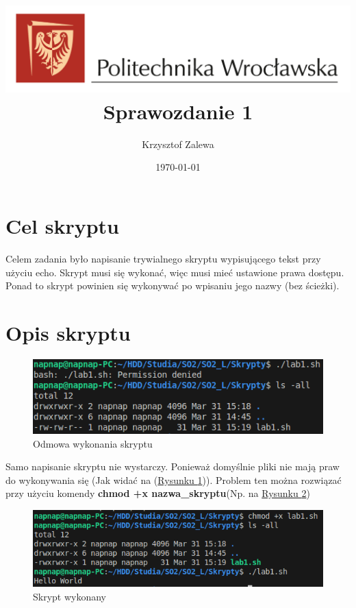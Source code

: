 \documentclass{article}
\title{
  \centering
  \includegraphics[width=\textwidth]{images/logo_PWr_kolor_poziom.png}\\
  \fontsize{28pt}{30pt}\selectfont Sprawozdanie 1\\
  }
\author{Krzysztof Zalewa}
\date{\daymonthyear\today}
\begin{document}
    \maketitle
    \pagebreak
    \tableofcontents
    \FloatBarrier
    \section{Cel skryptu}
      Celem zadania było napisanie trywialnego skryptu wypisującego tekst przy użyciu echo.
      Skrypt musi się wykonać, więc musi mieć ustawione prawa dostępu. Ponad to skrypt powinien 
      się wykonywać po wpisaniu jego nazwy (bez ścieżki).
    \section{Opis skryptu}
      \FloatBarrier
      \begin{figure}[ht]
        \centering
        \includegraphics[width=\textwidth]{images/permission_denied.png}
        \caption{Odmowa wykonania skryptu}
        \label{fig:perm_denied}
      \end{figure}
      \FloatBarrier
      Samo napisanie skryptu nie wystarczy. Ponieważ domyślnie pliki nie mają praw do wykonywania się (Jak widać na
      (\hyperref[fig:perm_denied]{Rysunku \ref{fig:perm_denied}})). Problem ten można rozwiązać przy użyciu komendy
      \textbf{chmod +x nazwa\_skryptu}(Np. na \hyperref[fig:perm_granted]{Rysunku \ref{fig:perm_granted}})
      \begin{figure}[ht]
        \centering
        \includegraphics[width=\textwidth]{images/permission_granted.png}
        \caption{Skrypt wykonany}
        \label{fig:perm_granted}
      \end{figure}
\end{document}
